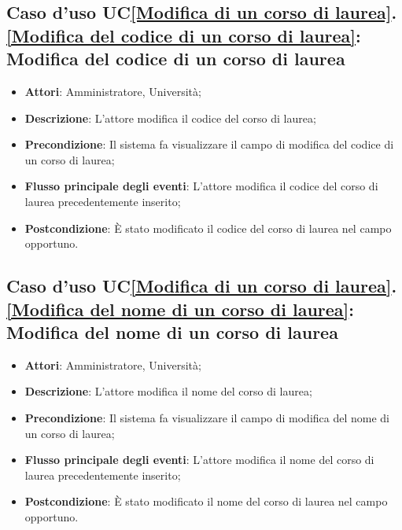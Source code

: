 \subsection{Caso d'uso UC\ref{Modifica di un corso di laurea}.\ref{Modifica del codice di un corso di laurea}: Modifica del codice di un corso di laurea}
\begin{itemize}
	\item \textbf{Attori}: Amministratore, Università;
	\item \textbf{Descrizione}: L'attore modifica il codice del corso di laurea;
	
	\item \textbf{Precondizione}: Il sistema fa visualizzare il campo di modifica del codice di un corso di laurea;
	\item \textbf{Flusso principale degli eventi}: L'attore modifica il codice del corso di laurea precedentemente inserito;
	
	\item \textbf{Postcondizione}: È stato modificato il codice del corso di laurea nel campo opportuno.
	
	
\end{itemize}

\subsection{Caso d'uso UC\ref{Modifica di un corso di laurea}.\ref{Modifica del nome di un corso di laurea}: Modifica del nome di un corso di laurea}
\begin{itemize}
	\item \textbf{Attori}: Amministratore, Università;
	\item \textbf{Descrizione}: L'attore modifica il nome del corso di laurea;
	
	\item \textbf{Precondizione}: Il sistema fa visualizzare il campo di modifica del nome di un corso di laurea;
	
	\item \textbf{Flusso principale degli eventi}: L'attore modifica il nome del corso di laurea precedentemente inserito;
	
	\item \textbf{Postcondizione}: È stato modificato il nome del corso di laurea nel campo opportuno.
	
	
\end{itemize}


